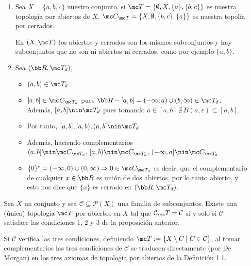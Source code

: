 \begin{ejem}
\begin{enumerate}
    \item Sea $X=\{a,b,c\}$ nuestro conjunto, si $\mc T=\{\emptyset, X, \{a\},\{b,c\}\}$ es nuestra topolog\'ia por abiertos de $X$, $\mc C_{\mc T} = \{X, \emptyset,\{b,c\},\{a\}\}$ es nuestra topol\'ia por cerrados.
    
    En $(X,\mc T)$ los abiertos y cerrados son los mismos subconjuntos y hay subconjuntos que no son ni abiertos ni cerrados, como por ejemplo $\{a,b\}$.
    \item Sea $(\bb R, \mc T_d)$,
    \begin{itemize}
        \item $(a,b) \in \mc T_d$
        \item $[a,b] \in \mc C_{\mc T_d}$ pues $\bb R - [a,b] = (-\infty,a) \cup(b,\infty) \in \mc T_d$. Adem\'as, $[a,b]\nin \mc T_d$ pues tomando $a\in [a,b] \, \nexists \, B(a, \varepsilon) \subset [a,b]$.
        \item Por tanto, $ [a,b],[a,b),(a,b] \nin \mc T_d$
        \item Adem\'as, haciendo complementarios $(a,b] \nin \mc C_{\mc T_d}, \, [a,b) \nin \mc C_{\mc T_d}, \, (-\infty, a] \nin \mc C_{\mc T_d}$
        \item $\{0\}^c=(-\infty,0) \cup (0,\infty) \Rightarrow 0 \in \mc C_{\mc T_d}$ es decir, que el complementario de cualquier $x\in \bb R$ es uni\'on de dos abiertos, por lo tanto abierto, y esto nos dice que $\{x\}$ es cerrado en $(\bb R, \mc T_d)$.
    \end{itemize}
\end{enumerate}
\end{ejem}

\begin{teo}
Sea \(X\) un conjunto y sea \(\mathcal{C} \subseteq \mathcal{P}(X)\) una familia de subconjuntos. Existe una (única) topología \(\mc T\) por abiertos en \(X\) tal que \(\mathcal{C}_\mc T = \mathcal{C}\) si y solo si \(\mathcal{C}\) satisface las condiciones 1, 2 y 3 de la proposición anterior.
\end{teo}

\begin{dem}
Si \(\mathcal{C}\) verifica las tres condiciones, definiendo \(\mc T := \{X \setminus C \mid C \in \mathcal{C}\}\), al tomar complementarios las tres condiciones de \(\mathcal{C}\) se traducen directamente (por De Morgan) en los tres axiomas de topología por abiertos de la Definición 1.1.
\end{dem}

